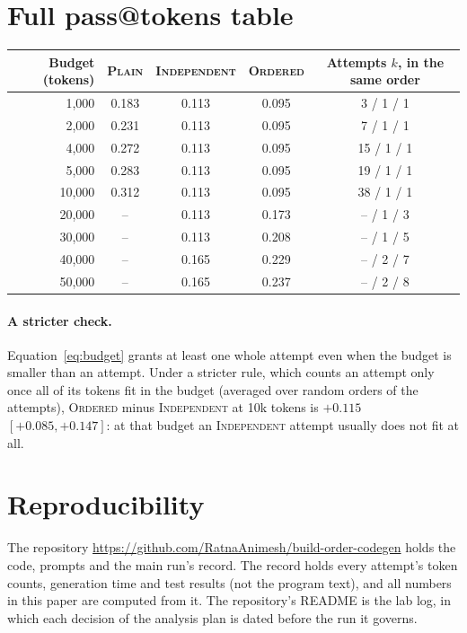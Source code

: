 \documentclass[11pt]{article}
\newcommand{\plain}{\textsc{Plain}}
\newcommand{\indep}{\textsc{Independent}}
\newcommand{\ordered}{\textsc{Ordered}}
\begin{document}
\section{Full pass@tokens table}
\label{app:full}

\begin{center}
\begin{tabular}{rcccc}
\toprule
Budget (tokens) & \plain{} & \indep{} & \ordered{} & Attempts $k$, in the same order \\
\midrule
1,000  & 0.183 & 0.113 & 0.095 & 3 / 1 / 1 \\
2,000  & 0.231 & 0.113 & 0.095 & 7 / 1 / 1 \\
4,000  & 0.272 & 0.113 & 0.095 & 15 / 1 / 1 \\
5,000  & 0.283 & 0.113 & 0.095 & 19 / 1 / 1 \\
10,000 & 0.312 & 0.113 & 0.095 & 38 / 1 / 1 \\
20,000 & --    & 0.113 & 0.173 & -- / 1 / 3 \\
30,000 & --    & 0.113 & 0.208 & -- / 1 / 5 \\
40,000 & --    & 0.165 & 0.229 & -- / 2 / 7 \\
50,000 & --    & 0.165 & 0.237 & -- / 2 / 8 \\
\bottomrule
\end{tabular}
\end{center}

\paragraph{A stricter check.} Equation~\eqref{eq:budget} grants at least one whole attempt even when the budget is
smaller than an attempt. Under a stricter rule, which counts an attempt only once all of its tokens fit in the budget
(averaged over random orders of the attempts), \ordered{} minus \indep{} at 10k tokens is $+0.115$ $[+0.085, +0.147]$:
at that budget an \indep{} attempt usually does not fit at all.

\section{Reproducibility}
\label{app:repro}

The repository \url{https://github.com/RatnaAnimesh/build-order-codegen} holds the code, prompts and the main run's
record. The record holds every attempt's token counts,
generation time and test results (not the program text), and all numbers in this paper are computed from it. The
repository's README is the lab log, in which each decision of the analysis plan is dated before the run it governs.
\end{document}

